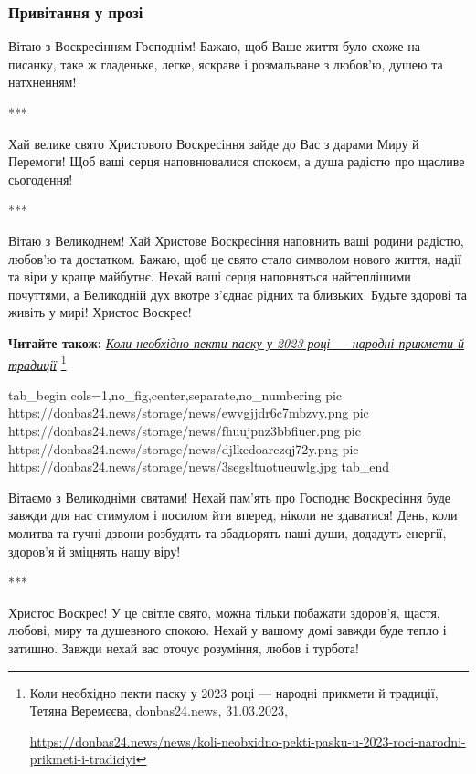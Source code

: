 \subsubsection{Привітання у прозі}

Вітаю з Воскресінням Господнім! Бажаю, щоб Ваше життя було схоже на писанку,
таке ж гладеньке, легке, яскраве і розмальване з любов'ю, душею та натхненням!

***

Хай велике свято Христового Воскресіння зайде до Вас з дарами Миру й Перемоги!
Щоб ваші серця наповнювалися спокоєм, а душа радістю про щасливе сьогодення!

***

Вітаю з Великоднем! Хай Христове Воскресіння наповнить ваші родини радістю,
любов'ю та достатком. Бажаю, щоб це свято стало символом нового життя, надії та
віри у краще майбутнє. Нехай ваші серця наповняться найтеплішими почуттями, а
Великодній дух вкотре з'єднає рідних та близьких. Будьте здорові та живіть у
мирі! Христос Воскрес!

\textbf{Читайте також:} \href{https://donbas24.news/news/koli-neobxidno-pekti-pasku-u-2023-roci-narodni-prikmeti-i-tradiciyi}{\emph{Коли необхідно пекти паску у 2023 році — народні прикмети й традиції}}%
\footnote{Коли необхідно пекти паску у 2023 році — народні прикмети й традиції, Тетяна Веремєєва, donbas24.news, 31.03.2023, \par%
\url{https://donbas24.news/news/koli-neobxidno-pekti-pasku-u-2023-roci-narodni-prikmeti-i-tradiciyi}%
}

\ifcmt
  tab_begin cols=1,no_fig,center,separate,no_numbering
     pic https://donbas24.news/storage/news/ewvgjjdr6c7mbzvy.png
     pic https://donbas24.news/storage/news/fhuujpnz3bbfiuer.png
     pic https://donbas24.news/storage/news/djlkedoarczqj72y.png
     pic https://donbas24.news/storage/news/3segsltuotueuwlg.jpg
  tab_end
\fi

Вітаємо з Великодніми святами! Нехай пам'ять про Господнє Воскресіння буде
завжди для нас стимулом і посилом йти вперед, ніколи не здаватися! День, коли
молитва та гучні дзвони розбудять та збадьорять наші души, додадуть енергії,
здоров'я й зміцнять нашу віру!

***

Христос Воскрес! У це світле свято, можна тільки побажати здоров'я, щастя,
любові, миру та душевного спокою. Нехай у вашому домі завжди буде тепло і
затишно. Завжди нехай вас оточує розуміння, любов і турбота!

